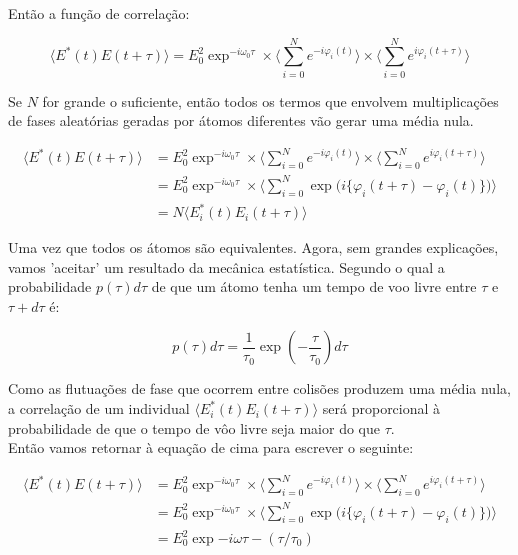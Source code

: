 \documentclass[12pt,a4paper]{report}
\begin{document}
Então a função de correlação:

\begin{equation}
    \langle E^*(t)E(t+\tau) \rangle = E_0^2\exp^{-i\omega_0\tau} \times \big\langle \sum_{i=0}^N{e^{-i\varphi_i(t)}} \big\rangle \times \big\langle \sum_{i=0}^N{e^{i\varphi_i(t+\tau)}} \big\rangle
\end{equation}

Se $N$ for grande o suficiente, então todos os termos que envolvem multiplicações de fases aleatórias geradas por átomos diferentes vão gerar uma média nula.

\begin{align*}
    \langle E^*(t)E(t+\tau) \rangle & = E_0^2\exp^{-i\omega_0\tau} \times \big\langle \sum_{i=0}^N{e^{-i\varphi_i(t)}} \big\rangle \times \big\langle \sum_{i=0}^N{e^{i\varphi_i(t+\tau)}} \big\rangle\\
    & = E_0^2\exp^{-i\omega_0\tau} \times \big\langle \sum_{i=0}^N{\exp \big(i \{\varphi_i(t+\tau)-\varphi_i(t)\}\big) } \big\rangle\\
    & = N\langle E_i^*(t)E_i(t+\tau) \rangle
\end{align*}

Uma vez que todos os átomos são equivalentes. Agora, sem grandes explicações, vamos 'aceitar' um resultado da mecânica estatística. Segundo o qual a probabilidade $p(\tau)d\tau$ de que um átomo tenha um tempo de voo livre entre $\tau$ e $\tau+d\tau$ é:

\begin{equation*}
    p(\tau)d\tau=\frac{1}{\tau_0}\exp(-\frac{\tau}{\tau_0})d\tau
\end{equation*}

Como as flutuações de fase que ocorrem entre colisões produzem uma média nula, a correlação de um individual $\langle E_i^*(t)E_i(t+\tau) \rangle$ será proporcional à probabilidade de que o tempo de vôo livre seja maior do que $\tau$.\\

Então vamos retornar à equação de cima para escrever o seguinte:

\begin{align*}
    \langle E^*(t)E(t+\tau) \rangle & = E_0^2\exp^{-i\omega_0\tau} \times \big\langle \sum_{i=0}^N{e^{-i\varphi_i(t)}} \big\rangle \times \big\langle \sum_{i=0}^N{e^{i\varphi_i(t+\tau)}} \big\rangle\\
    & = E_0^2\exp^{-i\omega_0\tau} \times \big\langle \sum_{i=0}^N{\exp \big(i \{\varphi_i(t+\tau)-\varphi_i(t)\}\big) } \big\rangle\\
    & = E_0^2\exp{-i\omega\tau-(\tau/\tau_0)}
\end{align*}
\end{document}
